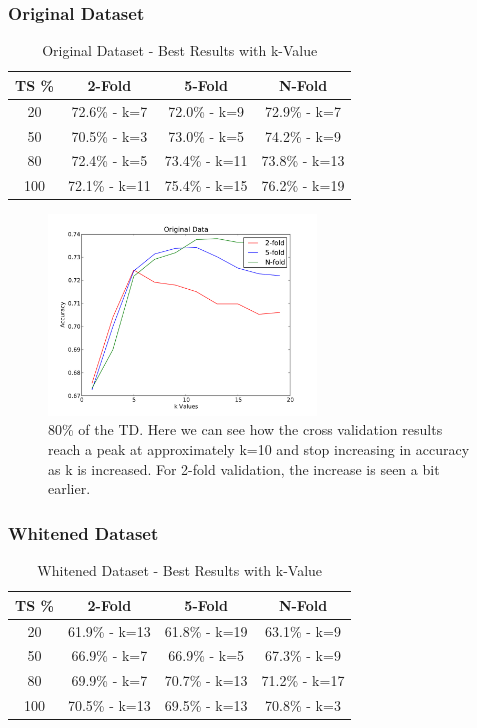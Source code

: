 \documentclass[conference]{acmsiggraph}
\begin{document}
\subsubsection{Original Dataset}
\begin{table}[h]
\caption{Original Dataset - Best Results with k-Value}
\centering
\begin{tabular}{c c c c}
\hline\hline
TS \% & 2-Fold & 5-Fold & N-Fold \\ [0.5ex]
\hline
20 & 72.6\% - k=7 & 72.0\% - k=9 & 72.9\% - k=7 \\
50 & 70.5\% - k=3 & 73.0\% - k=5 & 74.2\% - k=9 \\
80 & 72.4\% - k=5 & 73.4\% - k=11 & 73.8\% - k=13 \\
100 & 72.1\% - k=11 & 75.4\% - k=15 & 76.2\% - k=19 \\
\hline
\end{tabular}
\label{dba_n_res_table}
\end{table}

\begin{figure}[h]
  \centering
  \includegraphics[width=2.8in]{images/pi_o_80.pdf}
  \caption{80\% of the TD. Here we can see how the cross validation results reach a peak at approximately k=10 and stop increasing in accuracy as k is increased. For 2-fold validation, the increase is seen a bit earlier.}
  \label{fig:pio}
\end{figure}

\subsubsection{Whitened Dataset}

\begin{table}[ht]
\caption{Whitened Dataset - Best Results with k-Value}
\centering
\begin{tabular}{c c c c}
\hline\hline
TS \% & 2-Fold & 5-Fold & N-Fold \\ [0.5ex]
\hline
20 & 61.9\% - k=13 & 61.8\% - k=19 & 63.1\% - k=9 \\
50 & 66.9\% - k=7 & 66.9\% - k=5 & 67.3\% - k=9 \\
80 & 69.9\% - k=7 & 70.7\% - k=13 & 71.2\% - k=17 \\
100 & 70.5\% - k=13 & 69.5\% - k=13 & 70.8\% - k=3 \\
\hline
\end{tabular}
\label{dba_w_res_table}
\end{table}
\end{document}
